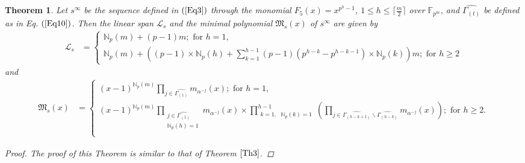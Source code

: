 \documentclass[pdflatex,sn-mathphys-num]{sn-jnl}%
\theoremstyle{thmstyleone}%
\newtheorem{theorem}{Theorem}%
\theoremstyle{thmstyletwo}%
\theoremstyle{thmstylethree}%
\begin{document}
\hspace{0.1mm}
\begin{theorem}\label{Th4} 
    Let $s^{\infty}$ be the sequence defined in $(\ref{Eq3})$ through the monomial $F_{5}(x)=x^{p^h-1}$, $1\leq h\leq\lceil\frac{m}{2}\rceil$ over $\mathbb{F}_{p^m}$, and $\widehat{\Gamma_{(t)}}$ be defined as in Eq. $(\ref{Eq10})$. Then the linear span $\mathcal{L}_{s}$ and the minimal polynomial $\mathfrak{M}_{s}(x)$ of $s^{\infty}$ are given by 
     \begin{align*}
        \mathcal{L}_{s} &=\begin{cases}
            \mathbb{N}_{p}(m)+(p-1)m;\text{ for }h=1, \\
            \mathbb{N}_{p}(m)+\left((p-1)\times\mathbb{N}_{p}(h)+\sum_{k=1}^{h-1}(p-1)(p^{h-k}-p^{h-k-1})\times\mathbb{N}_{p}(k)\right) m;\text{ for }h\geq 2
        \end{cases}    
    \end{align*}
    and
    \begin{align*}
        \mathfrak{M}_{s}(x) &= \begin{cases}
            (x-1)^{\mathbb{N}_{p}(m)}\prod_{j\in\widehat{\Gamma_{(1)}}}m_{\alpha^{-j}}(x);\text{ for }h=1, \\
            (x-1)^{\mathbb{N}_{p}(m)}\prod_{\substack{j\in\widehat{\Gamma_{(1)}}\\\mathbb{N}_{p}(h)=1}}m_{\alpha^{-j}}(x)\times \prod_{\substack{k=1,\text{ }\mathbb{N}_{p}(k)=1}}^{h-1}\left(\prod_{j\in\widehat{\Gamma_{(h-k+1)}}\backslash\widehat{\Gamma_{(h-k)}}}m_{\alpha^{-j}}(x)\right);\text{ for }h\geq 2. \\
        \end{cases}
    \end{align*}
    \begin{proof}
        The proof of this Theorem is similar to that of Theorem $\ref{Th3}$. 
    \end{proof}
\end{theorem}
\end{document}
